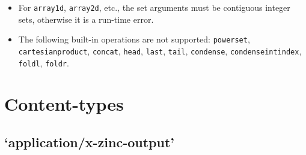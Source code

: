 \documentclass[10pt]{scrartcl}
\begin{document}
{\begin{itemize}
\item
    For \texttt{array1d}, \texttt{array2d}, etc., the set arguments must be
    contiguous integer sets, otherwise it is a run-time error.

\item
    The following built-in operations are not supported:    %
    \texttt{powerset},                                      %
    \texttt{cartesian\n{}product},                          %
    \texttt{concat},                                        %
    \texttt{head}, \texttt{last}, \texttt{tail},            %
    \texttt{condense}, \texttt{condense\n{}int\n{}index},   %
    \texttt{foldl}, \texttt{foldr}.                         %
\iffalse
\item
    The following built-in annotations are not supported:
    \texttt{tree\n{}search}.
\fi
\end{itemize}



\iffalse

\subsection{Other}
MiniZinc has the following other restrictions.
\begin{itemize}
\item
    \texttt{globals.mzn} is the equivalent to the Zinc \texttt{globals.zinc}
    library.
\end{itemize}
\fi
}

\clearpage
\section{Content-types}
  \label{Content-types}

\subsection{`application/x-zinc-output'}
  \label{x-zinc-output}
\end{document}
